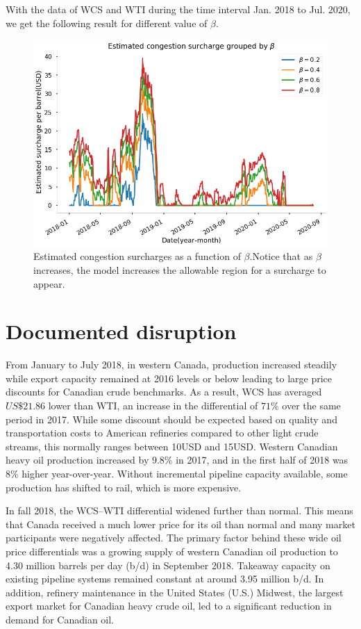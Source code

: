 \documentclass[11pt]{m2pi}
\begin{document}
With the data of WCS and WTI during the time interval Jan. 2018 to Jul. 2020, we get the following result for different value of $\beta$.

\begin{figure}
    \centering
    \includegraphics[width = \linewidth]{Estimated surcharge grouped by beta.png}
    \caption{Estimated congestion surcharges as a function of $\beta$.Notice that as $\beta$ increases, the model increases the allowable region for a surcharge to appear.}
    \label{fig:estsurcharge}
\end{figure}



\section{Documented disruption}
From January to July 2018, in western Canada, production increased steadily while export capacity remained at 2016 levels or below leading to large price discounts for Canadian crude benchmarks. As a result, WCS has averaged $US\$21.86$ lower than WTI, an increase in the differential of $71\%$ over the same period in 2017. While some discount should be expected based on quality and transportation costs to American refineries compared to other light crude streams, this normally ranges between 10USD and 15USD. Western Canadian heavy oil production increased by $9.8\%$ in 2017, and in the first half of 2018 was $8\%$ higher year-over-year. Without incremental pipeline capacity available, some production has shifted to rail, which is more expensive.%

In fall 2018, the WCS--WTI differential widened further than normal. This means that Canada received a much lower price for its oil than normal and many market participants were negatively affected. The primary factor behind these wide oil price differentials was a growing supply of western Canadian oil production to 4.30 million barrels per day (b/d) in September 2018. Takeaway capacity on existing pipeline systems remained constant at around 3.95 million b/d. In addition, refinery maintenance in the United States (U.S.) Midwest, the largest export market for Canadian heavy crude oil, led to a significant reduction in demand for Canadian oil.%
\end{document}
